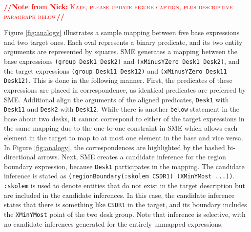 \documentclass[letterpaper]{article}
\newcommand{\from}[2]{\textcolor{red}{\noindent\textbf{//}\textbf{Note
      from #1:}\textsc{ #2}\textbf{//}}}
\newcommand{\fw}[1]{\texttt{#1}}
\begin{document}
\from{Nick}{Kate, please update figure caption, plus descriptive paragraph below}

Figure \ref{fig:analogy} illustrates a sample mapping between five base expressions and two target ones. Each oval represents a binary predicate, and its two entity arguments are represented by squares. SME generates a mapping between the base expressions \fw{(group Desk1 Desk2)} and \fw{(xMinusYZero Desk1 Desk2)}, and the  target expressions \fw{(group Desk11 Desk12)} and \fw{(xMinusYZero Desk11 Desk12)}. This is done in the following manner. First, the predicates of these expressions are placed in correspondence, as identical predicates are preferred by SME. Additional align the arguments of the aligned predicates, \fw{Desk1} with \fw{Desk11} and \fw{Desk2} with \fw{Desk12}. While there is another \fw{below} statement in the base about two desks, it cannot correspond to either of the target expressions in the same mapping due to the one-to-one constraint in SME which allows each element in the target to map to at most one element in the base and vice versa. In Figure \ref{fig:analogy}, the correspondences are highlighted by the hashed bi-directional arrows. Next, SME creates a candidate inference for the region boundary expression, because \fw{Desk1} participates in the mapping. The candidate inference is stated as \fw{(regionBoundary(:skolem CSDR1) (XMinYMost ...))}. \fw{:skolem} is used to denote entities that do not exist in the target description but are included in the candidate inferences. In this case, the candidate inference states that there is something like \fw{CSDR1} in the target, and its boundary includes the \fw{XMinYMost} point of the two desk group. Note that inference is selective, with no candidate inferences generated for the entirely unmapped expressions. %
 
\end{document}
